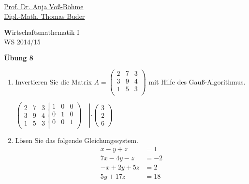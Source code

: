 \documentclass[12pt,a4paper]{scrreprt}
\newcommand{\Lsg}{\textbf{Lsg.:}}
\begin{document}
 
\begin{flushleft}
\href{mailto:anja.voss-boehme@htw-dresden.de}{Prof. Dr. Anja Voß-Böhme} \\
\href{mailto:buder@htw-dresden.de}{Dipl.-Math. Thomas Buder}
\end{flushleft}

\begin{center}{\large\textbf Wirtschaftsmathematik I} \\ WS 2014/15 \end{center}

\begin{center}{\large\bf Übung 8 } 
\end{center}


\bigskip
\begin{enumerate}
	\item Invertieren Sie die Matrix
$A=\begin{pmatrix}
 2 & 7 & 3\\
 3 & 9 & 4 \\
 1 & 5 & 3\\
\end{pmatrix}$ mit Hilfe des Gauß-Algorithmus.

$
\left(
\begin{matrix}
 2 & 7 & 3 \\
 3 & 9 & 4  \\
 1 & 5 & 3  
\end{matrix}
\left|
\begin{matrix}
1 & 0 & 0 \\
0 & 1 & 0 \\
0 & 0 & 1 \\
\end{matrix}
\right)
\right.
\hspace{1em} \left|\cdot\begin{pmatrix} 3 \\ 2 \\ 6 \end{pmatrix}\right.
$

	\item Lösen Sie das folgende Gleichungssystem.\begin{align*}
x - y +  z &= 1 \\
7x - 4y - z &= -2\\
-x + 2y + 5z &= 2\\
5y + 17z &= 18
\end{align*}


\end{enumerate}
\end{document}
